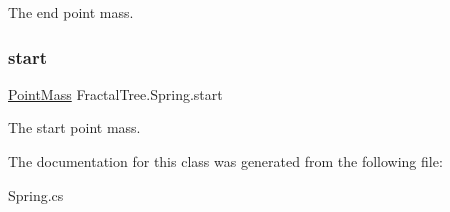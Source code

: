 The end point mass. 

\hypertarget{class_fractal_tree_1_1_spring_a4008f4f4f6404df50062047b0afa2ec8}{}\label{class_fractal_tree_1_1_spring_a4008f4f4f6404df50062047b0afa2ec8} 
\subsubsection{\texorpdfstring{start}{start}}
{\footnotesize\ttfamily \hyperlink{class_fractal_tree_1_1_point_mass}{Point\+Mass} Fractal\+Tree.\+Spring.\+start}



The start point mass. 



The documentation for this class was generated from the following file\+:\begin{DoxyCompactItemize}
\item 
Spring.\+cs\end{DoxyCompactItemize}
